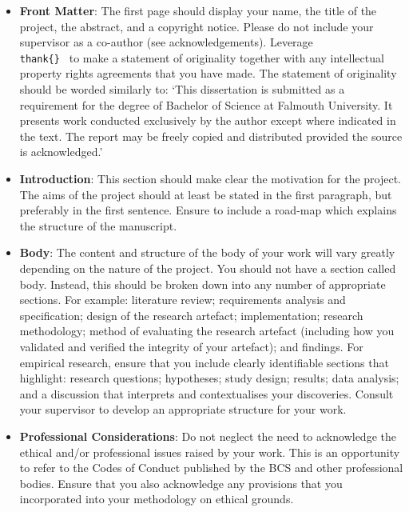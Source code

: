 \documentclass{../fal_assignment}
\begin{document}
\begin{itemize}

\setlength\itemsep{1em}

\item \textbf{Front Matter}: The first page should display your name, the title of the project, the abstract, and a copyright notice. Please do not include your supervisor as a co-author (see acknowledgements). Leverage \texttt{\\thank\{\} } to make a statement of originality together with any intellectual property rights agreements that you have made. The statement of originality should be worded similarly to: `This dissertation is submitted as a requirement for the degree of Bachelor of Science at Falmouth University. It presents work conducted exclusively by the author except where indicated in the text. The report may be freely copied and distributed provided the source is acknowledged.'

\item \textbf{Introduction}: This section should make clear the motivation for the project. The aims of the project should at least be stated in the first paragraph, but preferably in the first sentence. Ensure to include a road-map which explains the structure of the manuscript.

\item \textbf{Body}: The content and structure of the body of your work will vary greatly depending on the nature of the project. You should not have a section called body. Instead, this should be broken down into any number of appropriate sections. For example: literature review; requirements analysis and specification;  design of the research artefact; implementation; research methodology; method of evaluating the research artefact (including how you validated and verified the integrity of your artefact); and findings. For empirical research, ensure that you include clearly identifiable sections that highlight: research questions; hypotheses; study design; results; data analysis; and a discussion that interprets and contextualises your discoveries. Consult your supervisor to develop an appropriate structure for your work.

\item \textbf{Professional Considerations}: Do not neglect the need to acknowledge the ethical and/or professional issues raised by your work. This is an opportunity to refer to the Codes of Conduct published by the BCS and other professional bodies. Ensure that you also acknowledge any provisions that you incorporated into your methodology on ethical grounds.


\end{itemize}
\end{document}
